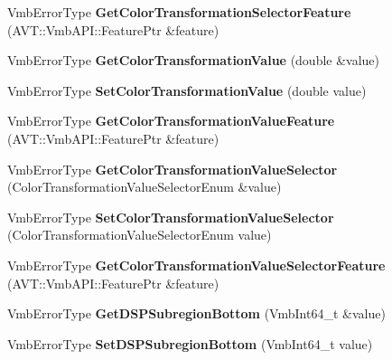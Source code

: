 \begin{DoxyCompactItemize}
\item 
\hypertarget{classMakoCamera_a750cb82a40a32ef8d55d19cd3d24314a}{Vmb\-Error\-Type {\bfseries Get\-Color\-Transformation\-Selector\-Feature} (A\-V\-T\-::\-Vmb\-A\-P\-I\-::\-Feature\-Ptr \&feature)}\label{classMakoCamera_a750cb82a40a32ef8d55d19cd3d24314a}

\item 
\hypertarget{classMakoCamera_a6dfec064c92c19e3a3c1eb19b8a928f5}{Vmb\-Error\-Type {\bfseries Get\-Color\-Transformation\-Value} (double \&value)}\label{classMakoCamera_a6dfec064c92c19e3a3c1eb19b8a928f5}

\item 
\hypertarget{classMakoCamera_adb0b086553386b39c9a7161f11be23d2}{Vmb\-Error\-Type {\bfseries Set\-Color\-Transformation\-Value} (double value)}\label{classMakoCamera_adb0b086553386b39c9a7161f11be23d2}

\item 
\hypertarget{classMakoCamera_a5ef4959a0ad305b71956e0102b0913e7}{Vmb\-Error\-Type {\bfseries Get\-Color\-Transformation\-Value\-Feature} (A\-V\-T\-::\-Vmb\-A\-P\-I\-::\-Feature\-Ptr \&feature)}\label{classMakoCamera_a5ef4959a0ad305b71956e0102b0913e7}

\item 
\hypertarget{classMakoCamera_a8ff0d8c25fac8f6a2b0f8a7195fe31ce}{Vmb\-Error\-Type {\bfseries Get\-Color\-Transformation\-Value\-Selector} (Color\-Transformation\-Value\-Selector\-Enum \&value)}\label{classMakoCamera_a8ff0d8c25fac8f6a2b0f8a7195fe31ce}

\item 
\hypertarget{classMakoCamera_a057cc2e37f771203b832d33c467298f8}{Vmb\-Error\-Type {\bfseries Set\-Color\-Transformation\-Value\-Selector} (Color\-Transformation\-Value\-Selector\-Enum value)}\label{classMakoCamera_a057cc2e37f771203b832d33c467298f8}

\item 
\hypertarget{classMakoCamera_aaf68882be0a05d3c7aae96075462b754}{Vmb\-Error\-Type {\bfseries Get\-Color\-Transformation\-Value\-Selector\-Feature} (A\-V\-T\-::\-Vmb\-A\-P\-I\-::\-Feature\-Ptr \&feature)}\label{classMakoCamera_aaf68882be0a05d3c7aae96075462b754}

\item 
\hypertarget{classMakoCamera_a22be4ace18cd7004c801bc825ad77f8a}{Vmb\-Error\-Type {\bfseries Get\-D\-S\-P\-Subregion\-Bottom} (Vmb\-Int64\-\_\-t \&value)}\label{classMakoCamera_a22be4ace18cd7004c801bc825ad77f8a}

\item 
\hypertarget{classMakoCamera_a0ffaa8ec9a8b525b220ea3dfc6131330}{Vmb\-Error\-Type {\bfseries Set\-D\-S\-P\-Subregion\-Bottom} (Vmb\-Int64\-\_\-t value)}\label{classMakoCamera_a0ffaa8ec9a8b525b220ea3dfc6131330}


\end{DoxyCompactItemize}
